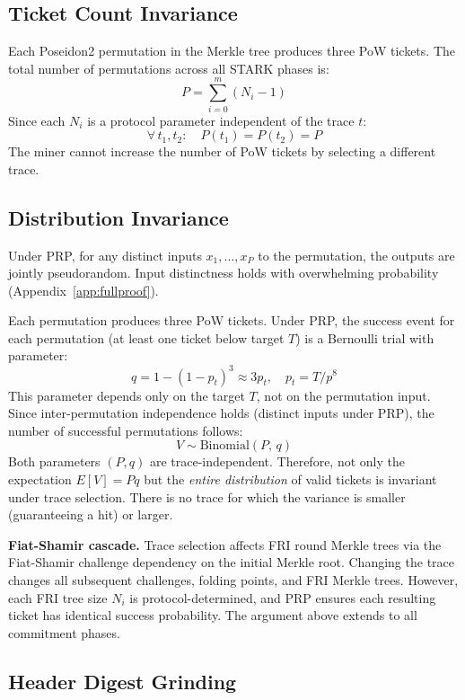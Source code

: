 \documentclass[11pt,a4paper]{article}
\begin{document}
\subsection{Ticket Count Invariance}

Each Poseidon2 permutation in the Merkle tree produces three PoW tickets. The total number of permutations across all STARK phases is:
\[
  P = \sum_{i=0}^{m} (N_i - 1)
\]
Since each $N_i$ is a protocol parameter independent of the trace $t$:
\[
  \forall\, t_1, t_2: \quad P(t_1) = P(t_2) = P
\]
The miner cannot increase the number of PoW tickets by selecting a different trace.

\subsection{Distribution Invariance}

Under PRP, for any distinct inputs $x_1, \ldots, x_P$ to the permutation, the outputs are jointly pseudorandom. Input distinctness holds with overwhelming probability (Appendix~\ref{app:fullproof}).

Each permutation produces three PoW tickets. Under PRP, the success event for each permutation (at least one ticket below target $T$) is a Bernoulli trial with parameter:
\[
  q = 1 - (1-p_t)^3 \approx 3p_t, \quad p_t = T / p^8
\]
This parameter depends only on the target $T$, not on the permutation input. Since inter-permutation independence holds (distinct inputs under PRP), the number of successful permutations follows:
\[
  V \sim \mathrm{Binomial}(P,\, q)
\]
Both parameters $(P, q)$ are trace-independent. Therefore, not only the expectation $E[V] = Pq$ but the \emph{entire distribution} of valid tickets is invariant under trace selection. There is no trace for which the variance is smaller (guaranteeing a hit) or larger.

\textbf{Fiat-Shamir cascade.} Trace selection affects FRI round Merkle trees via the Fiat-Shamir challenge dependency on the initial Merkle root. Changing the trace changes all subsequent challenges, folding points, and FRI Merkle trees. However, each FRI tree size $N_i$ is protocol-determined, and PRP ensures each resulting ticket has identical success probability. The argument above extends to all commitment phases.

\subsection{Header Digest Grinding}
\end{document}
